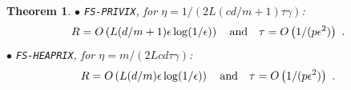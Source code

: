 \documentclass{article}
\newtheorem{theorem}{Theorem}
\begin{document}
\begin{theorem}
\noindent $\bullet$ \texttt{FS-PRIVIX}, for $\eta=1/(2L(c d/m+1)\tau\gamma)$: 
\begin{equation}\notag
R=O\left(L(d/m+1)\epsilon \log(1/\epsilon)\right) \quad \textrm{and} \quad \tau=O\left(1/(p\epsilon^2)\right)\ .
 \end{equation}
\noindent $\bullet$ \texttt{FS-HEAPRIX}, for $\eta=m/(2L c d\tau\gamma)$:
\begin{equation}\notag
R=O\left(L(d/m)\epsilon \log(1/\epsilon)\right) \quad \textrm{and} \quad \tau=O\left(1/(p\epsilon^2)\right)\ .
 \end{equation}
 \end{theorem}







%
\end{document}
